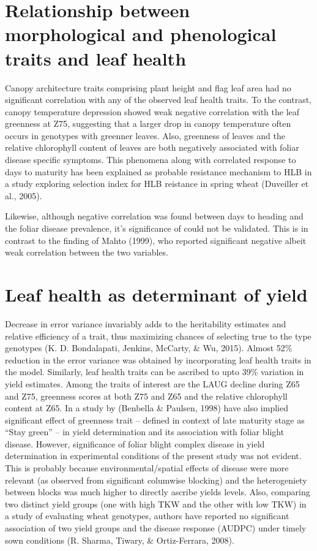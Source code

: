 \documentclass[12pt,oneside]{dukestatscithesis} %
\theoremstyle{definition}
\theoremstyle{definition}
\theoremstyle{definition}
\theoremstyle{remark}
\begin{document}
\section{Relationship between morphological and phenological traits and
leaf
health}\label{relationship-between-morphological-and-phenological-traits-and-leaf-health}

Canopy architecture traits comprising plant height and flag leaf area
had no significant correlation with any of the observed leaf health
traits. To the contrast, canopy temperature depression showed weak
negative correlation with the leaf greenness at Z75, suggesting that a
larger drop in canopy temperature often occurs in genotypes with
greenner leaves. Also, greenness of leaves and the relative chlorophyll
content of leaves are both negatively associated with foliar disease
specific symptoms. This phenomena along with correlated response to days
to maturity has been explained as probable resistance mechanism to HLB
in a study exploring selection index for HLB reistance in spring wheat
(Duveiller et al., 2005).

Likewise, although negative correlation was found between days to
heading and the foliar disease prevalence, it's significance of could
not be validated. This is in contrast to the finding of Mahto (1999),
who reported significant negative albeit weak correlation between the
two variables.

\section{Leaf health as determinant of
yield}\label{leaf-health-as-determinant-of-yield}

Decrease in error variance invariably adds to the heritability estimates
and relative efficiency of a trait, thus maximizing chances of selecting
true to the type genotypes (K. D. Bondalapati, Jenkins, McCarty, \& Wu,
2015). Almost 52\% reduction in the error variance was obtained by
incorporating leaf health traits in the model. Similarly, leaf health
traits can be ascribed to upto 39\% variation in yield estimates. Among
the traits of interest are the LAUG decline during Z65 and Z75,
greenness scores at both Z75 and Z65 and the relative chlorophyll
content at Z65. In a study by (Benbella \& Paulsen, 1998) have also
implied significant effect of greenness trait -- defined in context of
late maturity stage as ``Stay green'' -- in yield determination and its
association with foliar blight disease. However, significance of foliar
blight complex disease in yield determination in experimental conditions
of the present study was not evident. This is probably because
environmental/spatial effects of disease were more relevant (as observed
from significant columwise blocking) and the heterogeniety between
blocks was much higher to directly ascribe yields levels. Also,
comparing two distinct yield groups (one with high TKW and the other
with low TKW) in a study of evaluating wheat genotypes, authors have
reported no significant association of two yield groups and the disease
response (AUDPC) under timely sown conditions (R. Sharma, Tiwary, \&
Ortiz-Ferrara, 2008).
\end{document}
